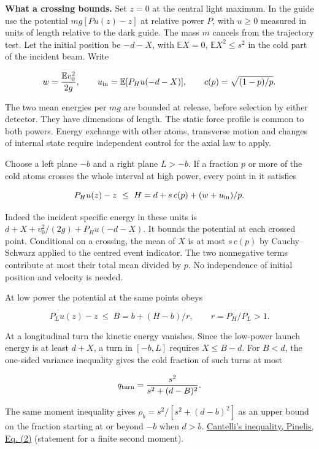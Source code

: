 \documentclass[11pt,a4paper]{article}
\begin{document}
\textbf{What a crossing bounds.} Set \(z=0\) at the central light
maximum. In the guide use the potential \(mg[P u(z)-z]\) at relative
power \(P\), with \(u\ge0\) measured in units of length relative to the
dark guide. The mass \(m\) cancels from the trajectory test. Let the
initial position be \(-d-X\), with \(\mathbb E X=0\),
\(\mathbb E X^2\le s^2\) in the cold part of the incident beam. Write

\[
 w=\frac{\mathbb E v_0^2}{2g},\qquad
 u_{\rm in}=\mathbb E[P_H u(-d-X)],\qquad
 c(p)=\sqrt{(1-p)/p}.
\]

The two mean energies per \(mg\) are bounded at release, before
selection by either detector. They have dimensions of length. The static
force profile is common to both powers. Energy exchange with other
atoms, transverse motion and changes of internal state require
independent control for the axial law to apply.

Choose a left plane \(-b\) and a right plane \(L>-b\). If a fraction
\(p\) or more of the cold atoms crosses the whole interval at high
power, every point in it satisfies

\[
 P_Hu(z)-z \ \le\ H=d+s\,c(p)+(w+u_{\rm in})/p .
\]

Indeed the incident specific energy in these units is
\(d+X+v_0^2/(2g)+P_Hu(-d-X)\). It bounds the potential at each crossed
point. Conditional on a crossing, the mean of \(X\) is at most
\(s\,c(p)\) by Cauchy--Schwarz applied to the centred event indicator.
The two nonnegative terms contribute at most their total mean divided by
\(p\). No independence of initial position and velocity is needed.

At low power the potential at the same points obeys

\[
 P_Lu(z)-z\ \le\ B=b+(H-b)/r,\qquad r=P_H/P_L>1 .
\]

At a longitudinal turn the kinetic energy vanishes. Since the low-power
launch energy is at least \(d+X\), a turn in \([-b,L]\) requires
\(X\le B-d\). For \(B<d\), the one-sided variance inequality gives the
cold fraction of such turns at most

\[
 q_{\rm turn}=\frac{s^2}{s^2+(d-B)^2}.
\]

The same moment inequality gives \(\rho_b=s^2/[s^2+(d-b)^2]\) as an
upper bound on the fraction starting at or beyond \(-b\) when \(d>b\).
\href{https://arxiv.org/pdf/1011.6065\#page=1}{Cantelli's inequality,
Pinelis, Eq. (2)} (statement for a finite second moment).
\end{document}
